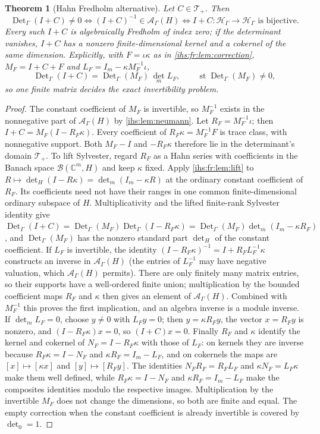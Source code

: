 \documentclass[11pt,a4paper]{article}
\numberwithin{equation}{section}
\newtheorem{theorem}{Theorem}[section]
\theoremstyle{definition}
\theoremstyle{remark}
\newcommand{\C}{\mathbb C}
\newcommand{\Hil}{\mathcal H_\Gamma}
\newcommand{\Ahh}{\mathcal A_\Gamma(H)}
\newcommand{\st}{\operatorname{st}}
\newcommand{\Det}{\operatorname{Det}_\Gamma}
\newcommand{\TT}{\mathscr T}
\begin{document}
\begin{theorem}[Hahn Fredholm alternative]\label{ihs:fr:thm:fredholm}
Let $C\in\TT_+$. Then
\begin{equation}\label{ihs:fr:eq:fredholmequivalence}
 \Det(I+C)\ne0\iff(I+C)^{-1}\in\Ahh\iff I+C:\Hil\to\Hil\text{ is bijective}.
\end{equation}
Every such $I+C$ is algebraically Fredholm of index zero; if the determinant
vanishes, $I+C$ has a nonzero finite-dimensional kernel and a cokernel of
the same dimension. Explicitly, with $F=\iota\kappa$ as in
\cref{ihs:fr:lem:correction}, $M_F=I+C+F$ and $L_F=I_m-\kappa M_F^{-1}\iota$,
\begin{equation}\label{ihs:fr:eq:finitefredholm}
 \Det(I+C)=\Det(M_F)\,\det_mL_F,\qquad \st\Det(M_F)\ne0,
\end{equation}
so one finite matrix decides the exact invertibility problem.
\end{theorem}
\begin{proof}
The constant coefficient of $M_F$ is invertible, so $M_F^{-1}$ exists in the
nonnegative part of $\Ahh$ by \cref{ihs:lem:neumann}. Let
$R_F=M_F^{-1}\iota$; then $I+C=M_F(I-R_F\kappa)$. Every coefficient of
$R_F\kappa=M_F^{-1}F$ is trace class, with nonnegative support.
Both $M_F-I$ and $-R_F\kappa$ therefore lie in the determinant's domain
$\TT_+$. To lift Sylvester, regard $R_F$ as a Hahn series with coefficients
in the Banach space $\mathcal B(\C^m,H)$ and keep $\kappa$ fixed. Apply
\cref{ihs:fr:lem:lift} to
$R\mapsto\det_H(I-R\kappa)=\det_m(I_m-\kappa R)$ at the ordinary
constant coefficient of $R_F$. Its coefficients need not have their ranges
in one common finite-dimensional ordinary subspace of $H$.
Multiplicativity and the lifted finite-rank Sylvester identity give
$\Det(I+C)=\Det(M_F)\Det(I-R_F\kappa)=\Det(M_F)\det_m(I_m-\kappa R_F)$, and
$\Det(M_F)$ has the nonzero standard part $\det_H$ of the constant
coefficient. If $L_F$ is invertible, the identity
$(I-R_F\kappa)^{-1}=I+R_FL_F^{-1}\kappa$ constructs an inverse in $\Ahh$
(the entries of $L_F^{-1}$ may have negative valuation, which $\Ahh$
permits). There are only finitely many matrix entries, so their supports
have a well-ordered finite union; multiplication by the bounded coefficient
maps $R_F$ and $\kappa$ then gives an element of $\Ahh$. Combined with
$M_F^{-1}$ this proves the first implication, and an
algebra inverse is a module inverse. If $\det_mL_F=0$, choose $y\ne0$ with
$L_Fy=0$; then $y=\kappa R_Fy$, the vector $x=R_Fy$ is nonzero, and
$(I-R_F\kappa)x=0$, so $(I+C)x=0$. Finally $R_F$ and $\kappa$ identify the
kernel and cokernel of $N_F=I-R_F\kappa$ with those of $L_F$: on kernels they
are inverse because $R_F\kappa=I-N_F$ and $\kappa R_F=I_m-L_F$, and on
cokernels the maps are $[x]\mapsto[\kappa x]$ and $[y]\mapsto[R_Fy]$.
The identities $N_FR_F=R_FL_F$ and $\kappa N_F=L_F\kappa$ make them well
defined, while $R_F\kappa=I-N_F$ and $\kappa R_F=I_m-L_F$ make the
composites identities modulo the respective images. Multiplication by the invertible $M_F$ does not change
the dimensions, so both are finite and equal. The empty correction when the
constant coefficient is already invertible is covered by $\det_0=1$.
\end{proof}
\end{document}
